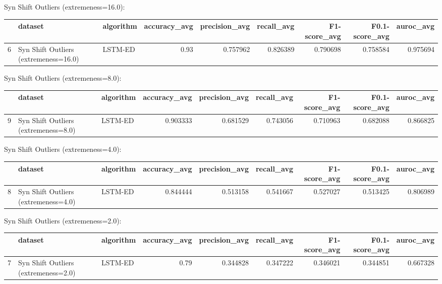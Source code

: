 Syn Shift Outliers (extremeness=16.0):

\begin{tabular}{rllrrrrrr}
\hline
    & dataset                               & algorithm   &   accuracy\_avg &   precision\_avg &   recall\_avg &   F1-score\_avg &   F0.1-score\_avg &   auroc\_avg \\
\hline
  6 & Syn Shift Outliers (extremeness=16.0) & LSTM-ED     &           0.93 &        0.757962 &     0.826389 &       0.790698 &         0.758584 &    0.975694 \\
\hline
\end{tabular}

Syn Shift Outliers (extremeness=8.0):

\begin{tabular}{rllrrrrrr}
\hline
    & dataset                              & algorithm   &   accuracy\_avg &   precision\_avg &   recall\_avg &   F1-score\_avg &   F0.1-score\_avg &   auroc\_avg \\
\hline
  9 & Syn Shift Outliers (extremeness=8.0) & LSTM-ED     &       0.903333 &        0.681529 &     0.743056 &       0.710963 &         0.682088 &    0.866825 \\
\hline
\end{tabular}

Syn Shift Outliers (extremeness=4.0):

\begin{tabular}{rllrrrrrr}
\hline
    & dataset                              & algorithm   &   accuracy\_avg &   precision\_avg &   recall\_avg &   F1-score\_avg &   F0.1-score\_avg &   auroc\_avg \\
\hline
  8 & Syn Shift Outliers (extremeness=4.0) & LSTM-ED     &       0.844444 &        0.513158 &     0.541667 &       0.527027 &         0.513425 &    0.806989 \\
\hline
\end{tabular}

Syn Shift Outliers (extremeness=2.0):

\begin{tabular}{rllrrrrrr}
\hline
    & dataset                              & algorithm   &   accuracy\_avg &   precision\_avg &   recall\_avg &   F1-score\_avg &   F0.1-score\_avg &   auroc\_avg \\
\hline
  7 & Syn Shift Outliers (extremeness=2.0) & LSTM-ED     &           0.79 &        0.344828 &     0.347222 &       0.346021 &         0.344851 &    0.667328 \\
\hline
\end{tabular}

